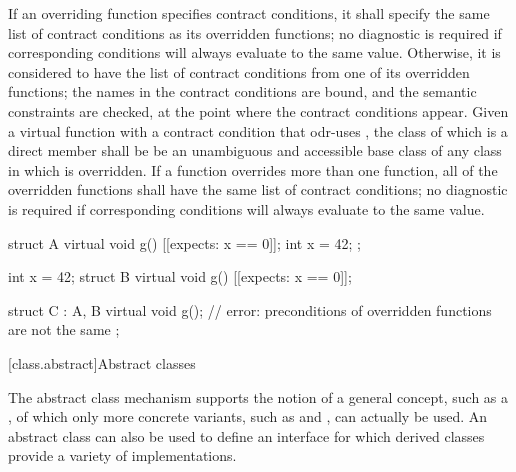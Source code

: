 \pnum
If an overriding function specifies contract conditions,
it shall specify the same list of contract conditions as
its overridden functions;
no diagnostic is required
if corresponding conditions will always evaluate to the same value.
Otherwise, it is considered to have
the list of contract conditions from one of its overridden functions;
the names in the contract conditions are bound,
and the semantic constraints are checked,
at the point where the contract conditions appear.
Given a virtual function 
with a contract condition that odr-uses ,
the class of which  is a direct member
shall be be an unambiguous and accessible base class of any class
in which  is overridden.
If a function overrides more than one function,
all of the overridden functions shall have
the same list of contract conditions;
no diagnostic is required
if corresponding conditions will always evaluate to the same value.
\begin{example}
\begin{codeblock}
struct A {
  virtual void g() [[expects: x == 0]];
  int x = 42;
};

int x = 42;
struct B {
  virtual void g() [[expects: x == 0]];
}

struct C : A, B {
  virtual void g();             // error: preconditions of overridden functions are not the same
};
\end{codeblock}
\end{example}

[class.abstract]{Abstract classes}%

\pnum
\begin{note}
The abstract class mechanism supports the notion of a general concept,
such as a , of which only more concrete variants, such as
 and , can actually be used. An abstract
class can also be used to define an interface for which derived classes
provide a variety of implementations.
\end{note}

